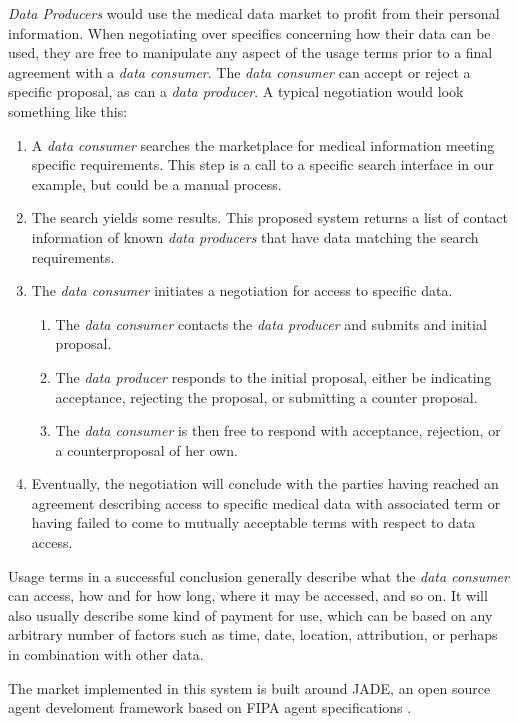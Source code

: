 \documentclass[10pt, conference, compsocconf]{IEEEtran}
\begin{document}
\textit{Data Producers} would use the medical data market to profit from their personal information.  When negotiating over specifics concerning how their data can be used, they are free to manipulate any aspect of the usage terms prior to a final agreement with a \textit{data consumer}.  The \textit{data consumer} can accept or reject a specific proposal, as can a \textit{data producer}.  A typical negotiation would look something like this:
\begin{enumerate}
\item A \textit{data consumer} searches the marketplace for medical information meeting specific requirements.  This step is a call to a specific search interface in our example, but could be a manual process.
\item The search yields some results.  This proposed system returns a list of contact information of known \textit{data producers} that have data matching the search requirements.
\item The \textit{data consumer} initiates a negotiation for access to specific data.
\begin{enumerate}
\item The \textit{data consumer} contacts the \textit{data producer} and submits and initial proposal.
\item The \textit{data producer} responds to the initial proposal, either be indicating acceptance, rejecting the proposal, or submitting a counter proposal.
\item The \textit{data consumer} is then free to respond with acceptance, rejection, or a counterproposal of her own.
\end{enumerate}
\item Eventually, the negotiation will conclude with the parties having reached an agreement describing access to specific medical data with associated term or having failed to come to mutually acceptable terms with respect to data access.  
\end{enumerate}

Usage terms in a successful conclusion generally describe what the \textit{data consumer} can access, how and for how long, where it may be accessed, and so on.  It will also usually describe some kind of payment for use, which can be based on any arbitrary number of factors such as time, date, location, attribution, or perhaps in combination with other data.

The market implemented in this system is built around JADE, an open source agent develoment framework based on FIPA agent specifications \cite{Emr:Web:Jade,Emr:Web:Fipa}.
\end{document}
